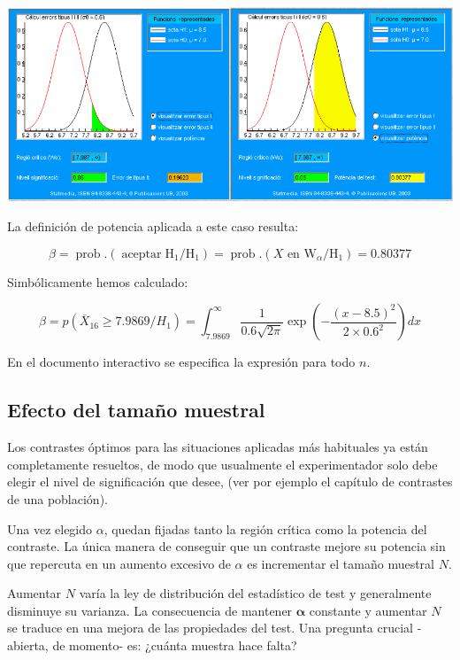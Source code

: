 \documentclass[
]{article}
\begin{document}
\begin{center}\includegraphics[width=0.9\linewidth]{images/cap9-PlotProbsTestOptim} \end{center}

La definición de potencia aplicada a este caso resulta:

\[
\beta=\operatorname{prob} .\left(\operatorname{aceptar} \mathrm{H}_{1} / \mathrm{H}_{1}\right)=\operatorname{prob} .\left(X \text { en } \mathrm{W}_{\alpha} / \mathrm{H}_{1}\right)=0.80377
\]

Simbólicamente hemos calculado:

\[
\beta=p\left(\bar{X}_{16} \geq 7.9869 / H_{1}\right)=\int_{7.9869}^{\infty} \frac{1}{0.6 \sqrt{2 \pi}} \exp \left(-\frac{(x-8.5)^{2}}{2 \times 0.6^{2}}\right) d x
\]

En el documento interactivo se especifica la expresión para todo \(n\).

\subsection{Efecto del tamaño muestral}\label{efecto-del-tamauxf1o-muestral}

Los contrastes óptimos para las situaciones aplicadas más habituales ya están completamente resueltos, de modo que usualmente el experimentador solo debe elegir el nivel de significación que desee, (ver por ejemplo el capítulo de contrastes de una población).

Una vez elegido \(\alpha\), quedan fijadas tanto la región crítica como la potencia del contraste. La única manera de conseguir que un contraste mejore su potencia sin que repercuta en un aumento excesivo de \(\alpha\) es incrementar el tamaño muestral \(N\).

Aumentar \(N\) varía la ley de distribución del estadístico de test y generalmente disminuye su varianza. La consecuencia de mantener \(\boldsymbol{\alpha}\) constante y aumentar \(N\) se traduce en una mejora de las propiedades del test. Una pregunta crucial -abierta, de momento- es: ¿cuánta muestra hace falta?
\end{document}
